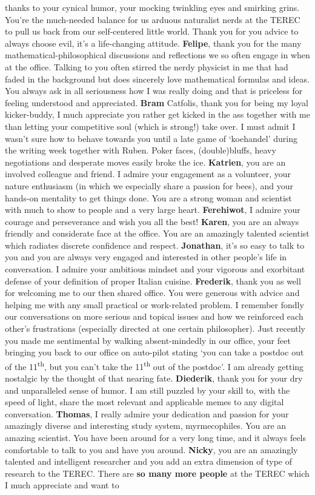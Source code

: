 \documentclass[10pt, twoside]{book} %
\begin{document}
\begin{small}
thanks to your cynical humor, your mocking twinkling eyes and smirking grins. You're the much-needed balance for us arduous naturalist nerds at the TEREC to pull us back from our self-centered little world. Thank you for you advice to always choose evil, it's a life-changing attitude. \textbf{Felipe}, thank you for the many mathematical-philosophical discussions and reflections we so often engage in when at the office. Talking to you often stirred the nerdy physicist in me that had faded in the background but does sincerely love mathematical formulas and ideas. You always ask in all seriousness how I was really doing and that is priceless for feeling understood and appreciated. \textbf{Bram} Catfolis, thank you for being my loyal kicker-buddy, I much appreciate you rather get kicked in the ass together with me than letting your competitive soul (which is strong!) take over. I must admit I wasn't sure how to behave towards you until a late game of `koehandel' during the writing week together with Ruben. Poker faces, (double)bluffs, heavy negotiations and desperate moves easily broke the ice. \textbf{Katrien}, you are an involved colleague and friend. I admire your engagement as a volunteer, your nature enthusiasm (in which we especially share a passion for bees), and your hands-on mentality to get things done. You are a strong woman and scientist with much to show to people and a very large heart. \textbf{Ferehiwot}, I admire your courage and perseverance and wish you all the best! \textbf{Karen}, you are an always friendly and considerate face at the office. You are an amazingly talented scientist which radiates discrete confidence and respect. \textbf{Jonathan}, it's so easy to talk to you and you are always very engaged and interested in other people's life in conversation. I admire your ambitious mindset and your vigorous and exorbitant defense of your definition of proper Italian cuisine. \textbf{Frederik}, thank you as well for welcoming me to our then shared office. You were generous with advice and helping me with any small practical or work-related problem. I remember fondly our conversations on more serious and topical issues and how we reinforced each other's frustrations (especially directed at one certain philosopher). Just recently you made me sentimental by walking absent-mindedly in our office, your feet bringing you back to our office on auto-pilot stating `you can take a postdoc out of the 11\textsuperscript{th}, but you can't take the 11\textsuperscript{th} out of the postdoc'. I am already getting nostalgic by the thought of that nearing fate. \textbf{Diederik}, thank you for your dry and unparalleled sense of humor. I am still puzzled by your skill to, with the speed of light, share the most relevant and applicable memes to any digital conversation. \textbf{Thomas}, I really admire your dedication and passion for your amazingly diverse and interesting study system, myrmecophiles. You are an amazing scientist. You have been around for a very long time, and it always feels comfortable to talk to you and have you around. \textbf{Nicky}, you are an amazingly talented and intelligent researcher and you add an extra dimension of type of research to the TEREC. There are \textbf{so many more people} at the TEREC which I much appreciate and want to 
\end{small}
\end{document}
